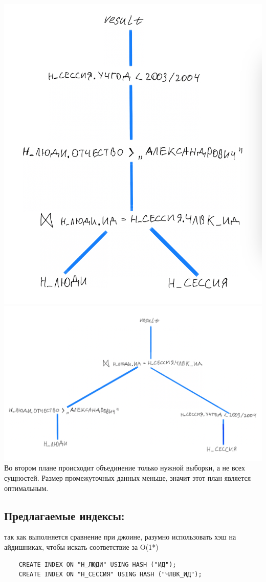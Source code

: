\includegraphics[scale=0.1]{img/3B458A37-05E0-4A86-8324-C65073974BD5_1_201_a}
\includegraphics[scale=0.1]{img/8FA30A9A-F375-4B3C-B2FE-26DF1407B0A3_1_201_a}
Во втором плане происходит объединение только нужной выборки, а не всех сущностей. Размер промежуточных данных меньше, значит этот план является оптимальным.

\subsection{Предлагаемые индексы:}
так как выполняется сравнение при джоине, разумно использовать хэш на айдишниках, чтобы искать соответствие за O(1*)
\begin{verbatim}
    CREATE INDEX ON "Н_ЛЮДИ" USING HASH ("ИД");
    CREATE INDEX ON "Н_СЕССИЯ" USING HASH ("ЧЛВК_ИД");
\end{verbatim}

